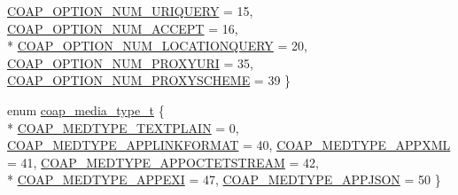 \begin{DoxyCompactItemize}
\hyperlink{group__open_coap_gga809c9a7522aa7e4726b4a95ccdb2833bab3039cd2da76c4a490307b9f56e262fa}{C\+O\+A\+P\+\_\+\+O\+P\+T\+I\+O\+N\+\_\+\+N\+U\+M\+\_\+\+U\+R\+I\+Q\+U\+E\+RY} = 15, 
\hyperlink{group__open_coap_gga809c9a7522aa7e4726b4a95ccdb2833ba68083aabd42f07eff26a8f437b73b399}{C\+O\+A\+P\+\_\+\+O\+P\+T\+I\+O\+N\+\_\+\+N\+U\+M\+\_\+\+A\+C\+C\+E\+PT} = 16, 
\\*
\hyperlink{group__open_coap_gga809c9a7522aa7e4726b4a95ccdb2833ba0588bac7e805aaac1bb1eec2094cf49a}{C\+O\+A\+P\+\_\+\+O\+P\+T\+I\+O\+N\+\_\+\+N\+U\+M\+\_\+\+L\+O\+C\+A\+T\+I\+O\+N\+Q\+U\+E\+RY} = 20, 
\hyperlink{group__open_coap_gga809c9a7522aa7e4726b4a95ccdb2833ba4332c205fc8ebbe6f3a946c2bd8e00a3}{C\+O\+A\+P\+\_\+\+O\+P\+T\+I\+O\+N\+\_\+\+N\+U\+M\+\_\+\+P\+R\+O\+X\+Y\+U\+RI} = 35, 
\hyperlink{group__open_coap_gga809c9a7522aa7e4726b4a95ccdb2833ba8a4439e4549f41301a471c6990bf76b9}{C\+O\+A\+P\+\_\+\+O\+P\+T\+I\+O\+N\+\_\+\+N\+U\+M\+\_\+\+P\+R\+O\+X\+Y\+S\+C\+H\+E\+ME} = 39
 \}
\item 
enum \hyperlink{group__open_coap_gaef18a213b721e5f11a0d12b394be1084}{coap\+\_\+media\+\_\+type\+\_\+t} \{ \\*
\hyperlink{group__open_coap_ggaef18a213b721e5f11a0d12b394be1084a3eb620ed79f0fd008e1a099781f138e4}{C\+O\+A\+P\+\_\+\+M\+E\+D\+T\+Y\+P\+E\+\_\+\+T\+E\+X\+T\+P\+L\+A\+IN} = 0, 
\hyperlink{group__open_coap_ggaef18a213b721e5f11a0d12b394be1084a4e096f618637348ab356c70524d1ddb9}{C\+O\+A\+P\+\_\+\+M\+E\+D\+T\+Y\+P\+E\+\_\+\+A\+P\+P\+L\+I\+N\+K\+F\+O\+R\+M\+AT} = 40, 
\hyperlink{group__open_coap_ggaef18a213b721e5f11a0d12b394be1084ae086860d7a2cce52fafa75db92c08b92}{C\+O\+A\+P\+\_\+\+M\+E\+D\+T\+Y\+P\+E\+\_\+\+A\+P\+P\+X\+ML} = 41, 
\hyperlink{group__open_coap_ggaef18a213b721e5f11a0d12b394be1084a0b140215aaa7e8763a81ff69218fef19}{C\+O\+A\+P\+\_\+\+M\+E\+D\+T\+Y\+P\+E\+\_\+\+A\+P\+P\+O\+C\+T\+E\+T\+S\+T\+R\+E\+AM} = 42, 
\\*
\hyperlink{group__open_coap_ggaef18a213b721e5f11a0d12b394be1084ad5bae428b527387f8a7b329a6283f8e5}{C\+O\+A\+P\+\_\+\+M\+E\+D\+T\+Y\+P\+E\+\_\+\+A\+P\+P\+E\+XI} = 47, 
\hyperlink{group__open_coap_ggaef18a213b721e5f11a0d12b394be1084acb5118bf020133735067e07700b57c15}{C\+O\+A\+P\+\_\+\+M\+E\+D\+T\+Y\+P\+E\+\_\+\+A\+P\+P\+J\+S\+ON} = 50
 \}
\end{DoxyCompactItemize}
